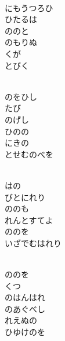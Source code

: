 \documentclass[10pt,b5j]{tarticle} %
\begin{document}
\begin{enumerate}
\begin{minipage}[c]{\blocksize}
        \vspace{\linespace}
        \item~\\
        にもうつろひ\\
        ひたるは\\
        ののと\\
        のもりぬ\\
        くが\\
        とびく
        
        \vspace{\linespace}
        \item~\\
        のをひし\\
        たび\\
        のげし\\
        ひのの\\
        にきの\\
        とせむのべを
        
        \vspace{\linespace}
        \item~\\
        はの\\
        びとにれり\\
        ののも\\
        れんとすてよ\\
        ののを\\
        いざでむはれり
        
        \vspace{\linespace}
        \item~\\
        ののを\\
        くつ\\
        のはんはれ\\
        のあぐべし\\
        れえぬの\\
        ひゆけのを
    
    \end{minipage}
\end{enumerate} %
\end{document}
